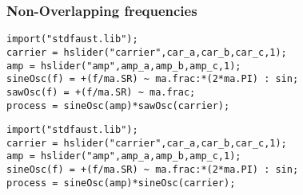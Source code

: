 \documentclass[12pt, oneside]{article} %
\newcommand{\FMMod}{\textbf{SineSaw-AM}}
\begin{document}
\subsubsection{Non-Overlapping frequencies}




\begin{lstlisting}[caption={\FMMod}, label={lst:program3},language=Faust,float,floatplacement=!H,xleftmargin=1em,xrightmargin=0.5em,firstnumber=0,aboveskip=0em, belowskip=-1em]
import("stdfaust.lib");
carrier = hslider("carrier",car_a,car_b,car_c,1);
amp = hslider("amp",amp_a,amp_b,amp_c,1);
sineOsc(f) = +(f/ma.SR) ~ ma.frac:*(2*ma.PI) : sin;
sawOsc(f) = +(f/ma.SR) ~ ma.frac;
process = sineOsc(amp)*sawOsc(carrier);
\end{lstlisting}


\begin{lstlisting}[caption={\FMMod-\textbf{V2}}, label={lst:program3_v2},language=Faust,float,floatplacement=!H,xleftmargin=1em,xrightmargin=0.5em,firstnumber=0,aboveskip=0em, belowskip=-1em]
import("stdfaust.lib");
carrier = hslider("carrier",car_a,car_b,car_c,1);
amp = hslider("amp",amp_a,amp_b,amp_c,1);
sineOsc(f) = +(f/ma.SR) ~ ma.frac:*(2*ma.PI) : sin;
process = sineOsc(amp)*sineOsc(carrier);
\end{lstlisting}



\end{document}
